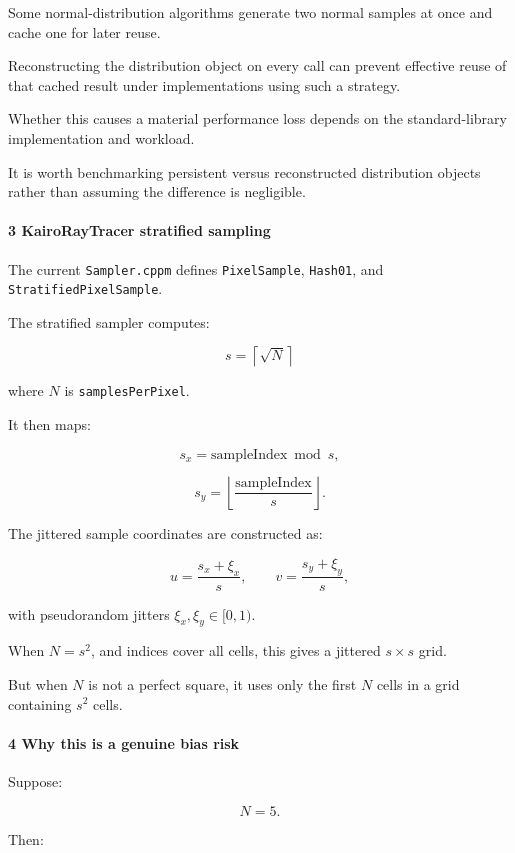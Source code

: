 Some normal-distribution algorithms generate two normal samples at once and cache one for later reuse.

Reconstructing the distribution object on every call can prevent effective reuse of that cached result under implementations using such a strategy.

Whether this causes a material performance loss depends on the standard-library implementation and workload.

It is worth benchmarking persistent versus reconstructed distribution objects rather than assuming the difference is negligible.

\paragraph{3 KairoRayTracer stratified sampling}\label{02-foundations-ii-ch039-kairoraytracer-stratified-sampling}

The current \texttt{Sampler.cppm} defines \texttt{PixelSample}, \texttt{Hash01}, and \texttt{StratifiedPixelSample}.

The stratified sampler computes:

\[
 s=\left\lceil\sqrt N\right\rceil
\]

where \(N\) is \texttt{samplesPerPixel}.

It then maps:

\[
 s_x=\text{sampleIndex}\bmod s,
\]

\[
 s_y=\left\lfloor\frac{\text{sampleIndex}}s\right\rfloor.
\]

The jittered sample coordinates are constructed as:

\[
 u=\frac{s_x+\xi_x}{s}, \qquad v=\frac{s_y+\xi_y}{s},
\]

with pseudorandom jitters \(\xi_x,\xi_y\in[0,1)\).

When \(N=s^2\), and indices cover all cells, this gives a jittered \(s\times s\) grid.

But when \(N\) is not a perfect square, it uses only the first \(N\) cells in a grid containing \(s^2\) cells.

\paragraph{4 Why this is a genuine bias risk}\label{02-foundations-ii-ch039-why-this-is-a-genuine-bias-risk}

Suppose:

\[
 N=5.
\]

Then:

